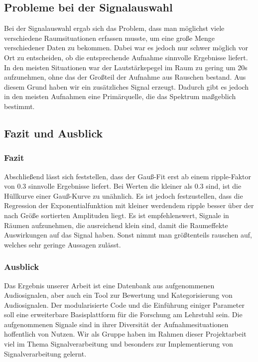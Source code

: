 \subsection{Probleme bei der Signalauswahl}
Bei der Signalauswahl ergab sich das Problem, dass man möglichst viele verschiedene Raumsituationen erfassen musste, um eine große Menge verschiedener Daten zu bekommen. Dabei war es jedoch nur schwer möglich vor Ort zu entscheiden, ob die entsprechende Aufnahme sinnvolle Ergebnisse liefert.
In den meisten Situationen war der Lautstärkepegel im Raum zu gering um 20s aufzunehmen, ohne das der Großteil der Aufnahme aus Rauschen bestand. Aus diesem Grund haben wir ein zusätzliches Signal erzeugt. Dadurch gibt es jedoch in den meisten Aufnahmen eine Primärquelle, die das Spektrum maßgeblich bestimmt.

\subsection{Fazit und Ausblick}
\subsubsection{Fazit}
Abschließend lässt sich feststellen, dass der Gauß-Fit erst ab einem ripple-Faktor von 0.3 sinnvolle Ergebnisse liefert. Bei Werten die kleiner als 0.3 sind, ist die Hüllkurve einer Gauß-Kurve zu unähnlich. Es ist jedoch festzustellen, dass die Regression der Exponentialfunktion mit kleiner werdendem ripple besser über der nach Größe sortierten Amplituden liegt.
Es ist empfehlenswert, Signale in Räumen aufzunehmen, die ausreichend klein sind, damit die Raumeffekte Auswirkungen auf das Signal haben. Sonst nimmt man größtenteils rauschen auf, welches sehr geringe Aussagen zulässt.
\subsubsection{Ausblick}
Das Ergebnis unserer Arbeit ist eine Datenbank aus aufgenommenen Audiosignalen, aber auch ein Tool zur Bewertung und Kategorisierung von Audiosignalen. Der modularisierte Code und die Einführung einiger Parameter soll eine erweiterbare Basisplattform für die Forschung am Lehrstuhl sein. Die aufgenommenen Signale sind in ihrer Diversität der Aufnahmesituationen hoffentlich von Nutzen. Wir als Gruppe haben im Rahmen dieser Projektarbeit viel im Thema Signalverarbeitung und besonders zur Implementierung von Signalverarbeitung gelernt.  
